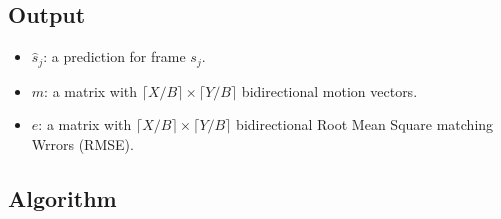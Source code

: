 \subsection*{Output}
\begin{itemize}
\tightlist
\item
  $\hat{s}_j$: a prediction for frame $s_j$.
\item
  $m$: a matrix with $\lceil X/B\rceil \times \lceil Y/B\rceil$
  bidirectional motion vectors.
\item
  $e$: a matrix with $\lceil X/B\rceil \times \lceil Y/B\rceil$
  bidirectional Root Mean Square matching Wrrors (RMSE).
\end{itemize}

\subsection*{Algorithm}

